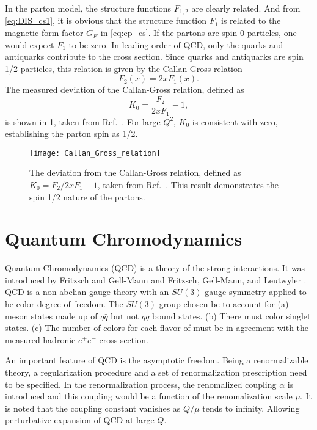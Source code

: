 \documentclass[../main.tex]{subfiles}
\begin{document}
In the parton model, the structure functions $F_{1,2}$ are clearly related. And
from \cref{eq:DIS_cs1}, it is obvious that the structure function $F_1$ is
related to the magnetic form factor $G_E$ in \cref{eq:ep_cs}. If the partons
are spin 0 particles, one would expect $F_1$ to be zero. In leading order of QCD,
only the quarks and antiquarks contribute to the cross section. Since quarks and
antiquarks are spin 1/2 particles, this relation is given by the Callan-Gross
relation \cite{callan1968,callan1969}
\begin{equation}
	F_2\left(x\right) = 2x F_1\left(x\right).
\end{equation}
The measured deviation of the Callan-Gross relation, defined as
\begin{equation}
	K_0 = \frac{F_2}{2xF_1}-1,
\end{equation}
is shown in \cref{fig:callan_gross}, taken from Ref.~\cite{kendall1991}.
For large $Q^2$, $K_0$ is consistent with zero, establishing the parton spin as
1/2.
\begin{figure}[htbp!]
	\centering
	\texttt{[image: Callan\_Gross\_relation]}
	\caption{The deviation from the Callan-Gross relation, defined as
		$K_0=F_2/2xF_1 -1$, taken from Ref.~\cite{kendall1991}. This result
		demonstrates the spin 1/2 nature of the partons.}
	\label{fig:callan_gross}
\end{figure}

\section{Quantum Chromodynamics}
\label{sec:QCD}
Quantum Chromodynamics (QCD) is a theory of the strong interactions. It was
introduced by Fritzsch and Gell-Mann \cite{fritzsch1972} and Fritzsch, Gell-Mann,
and Leutwyler \cite{fritzsch1973}. QCD is a non-abelian gauge theory with an
$SU(3)$ gauge symmetry applied to he color degree of freedom. The $SU(3)$ group
chosen be to account for (a) meson states made up of $q\bar{q}$ but not $qq$ bound states.
(b) There must color singlet states. (c) The number of colors for each flavor of
must be in agreement with the measured hadronic $e^+ e^-$ cross-section.


An important feature of QCD is the asymptotic freedom. Being a renormalizable
theory, a regularization procedure and a set of renormalization prescription
need to be specified. In the renormalization process, the renomalized coupling $\alpha$
is introduced and this coupling would be a function of the renomalization scale $\mu$.
It is noted that the coupling constant vanishes as $Q/\mu$ tends to infinity.
Allowing perturbative expansion of QCD at large $Q$.
\end{document}
